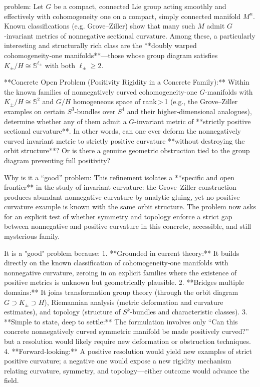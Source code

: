 problem:  
Let \(G\) be a compact, connected Lie group acting smoothly and effectively with cohomogeneity one on a compact, simply connected manifold \(M^n\).  Known classifications (e.g. Grove–Ziller) show that many such \(M\) admit \(G\)‑invariant metrics of nonnegative sectional curvature.  Among these, a particularly interesting and structurally rich class are the **doubly warped cohomogeneity‑one manifolds**—those whose group diagram satisfies \(K_\pm/H \cong \mathbb{S}^{\ell_\pm}\) with both \(\ell_\pm \ge 2\).

**Concrete Open Problem (Positivity Rigidity in a Concrete Family):**  
Within the known families of nonnegatively curved cohomogeneity‑one \(G\)-manifolds with \(K_\pm/H \cong \mathbb{S}^{2}\) and \(G/H\) homogeneous space of rank > 1 (e.g., the Grove–Ziller examples on certain \(S^3\)-bundles over \(S^4\) and their higher‑dimensional analogues), determine whether any of them admit a \(G\)-invariant metric of **strictly positive sectional curvature**.  
In other words, can one ever deform the nonnegatively curved invariant metric to strictly positive curvature **without destroying the orbit structure**?  Or is there a genuine geometric obstruction tied to the group diagram preventing full positivity?

Why is it a “good” problem:  
This refinement isolates a **specific and open frontier** in the study of invariant curvature: the Grove–Ziller construction produces abundant nonnegative curvature by analytic gluing, yet no positive curvature example is known with the same orbit structure.  The problem now asks for an explicit test of whether symmetry and topology enforce a strict gap between nonnegative and positive curvature in this concrete, accessible, and still mysterious family.

It is a "good" problem because:
1. **Grounded in current theory:**  It builds directly on the known classification of cohomogeneity‑one manifolds with nonnegative curvature, zeroing in on explicit families where the existence of positive metrics is unknown but geometrically plausible.
2. **Bridges multiple domains:**  It joins transformation group theory (through the orbit diagram \(G \supset K_\pm \supset H\)), Riemannian analysis (metric deformation and curvature estimates), and topology (structure of \(S^k\)-bundles and characteristic classes).
3. **Simple to state, deep to settle:**  The formulation involves only “Can this concrete nonnegatively curved symmetric manifold be made positively curved?” but a resolution would likely require new deformation or obstruction techniques.
4. **Forward‑looking:**  A positive resolution would yield new examples of strict positive curvature; a negative one would expose a new rigidity mechanism relating curvature, symmetry, and topology—either outcome would advance the field.